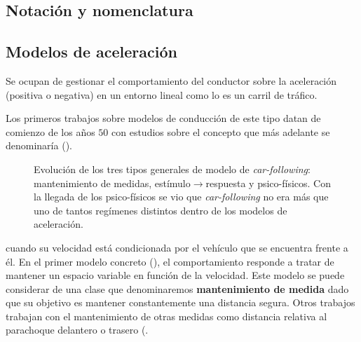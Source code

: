 \subsection{Notación y nomenclatura}


\subsection{Modelos de aceleración}

Se ocupan de gestionar el comportamiento del conductor sobre la aceleración (positiva o negativa) en un entorno lineal como lo es un carril de tráfico.

Los primeros trabajos sobre modelos de conducción de este tipo datan de comienzo de los años $50$ con estudios sobre el concepto que más adelante se denominaría \textit{} (\cite{reuschel1950fahrzeugbewegungen, Pipes1953}).

\begin{figure}
	\centering
	\caption{Evolución de los tres tipos generales de modelo de \textit{car-following}: mantenimiento de medidas, estímulo$\rightarrow$respuesta y psico-físicos. Con la llegada de los psico-físicos se vio que \textit{car-following} no era más que uno de tantos regímenes distintos dentro de los modelos de aceleración.}
	\label{fig:car-following-there-different-models}
\end{figure}

 cuando su velocidad está condicionada por el vehículo que se encuentra frente a él. En el primer modelo concreto (\cite{Pipes1953}), el comportamiento responde a tratar de mantener un espacio variable en función de la velocidad. Este modelo se puede considerar de una clase que denominaremos \textbf{mantenimiento de medida} dado que su objetivo es mantener constantemente una distancia segura. Otros trabajos trabajan con el mantenimiento de otras medidas como distancia relativa al parachoque delantero o trasero (.

